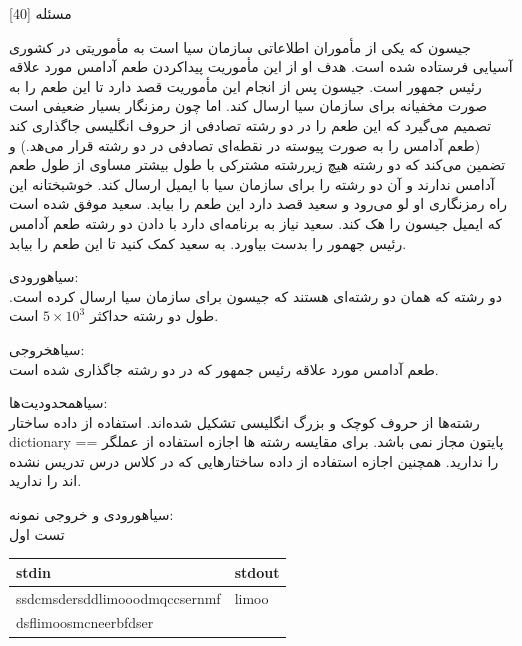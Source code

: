 ‌مسئله [40]

جیسون که یکی از مأموران اطلاعاتی سازمان سیا است به مأموریتی در کشوری آسیایی فرستاده شده است. هدف او از این مأموریت پیداکردن طعم آدامس مورد علاقه رئیس جمهور است. 
جیسون پس از انجام این مأموریت قصد دارد تا این طعم را به صورت مخفیانه برای سازمان سیا ارسال کند. اما چون رمزنگار بسیار ضعیفی است تصمیم می‌گیرد که این طعم را در دو رشته تصادفی از حروف انگلیسی جاگذاری کند (طعم آدامس را به صورت پیوسته در نقطه‌ای تصادفی در دو رشته قرار می‌هد.)  و تضمین می‌کند که دو رشته هیچ زیررشته مشترکی با طول بیشتر مساوی از طول طعم  آدامس  ندارند و آن دو رشته را برای سازمان سیا با ایمیل ارسال کند. خوشبختانه این راه رمزنگاری او لو می‌رود و سعید قصد دارد این طعم را بیابد. سعید موفق شده است که ایمیل جیسون را هک کند. سعید نیاز به برنامه‌ای دارد با دادن دو رشته طعم آدامس رئیس جهمور را بدست بیاورد.
به سعید کمک کنید تا این طعم را بیابد.

‌سیاه{ورودی:}\\
دو رشته که همان دو رشته‌ای هستند که جیسون برای سازمان سیا ارسال کرده است.
طول دو رشته حداکثر
$5 \times 10^3$
است.

‌سیاه{خروجی:}\\
طعم آدامس مورد علاقه رئیس جمهور که در دو رشته جاگذاری شده 
است.

‌سیاه{محدودیت‌ها:}\\
رشته‌ها از حروف کوچک و بزرگ انگلیسی تشکیل شده‌اند.
استفاده از داده ساختار dictionary پایتون مجاز نمی باشد. برای مقایسه رشته ها اجازه استفاده از عملگر == را ندارید. همچنین اجازه استفاده از داده ساختارهایی که در کلاس درس تدریس نشده اند را ندارید.

‌سیاه{ورودی و خروجی نمونه:}\\

تست اول
\begin{latin}
	\begin{tabularx}{\textwidth}{|X | X|}
		\hline
		\textbf{stdin} &
		\textbf{stdout}\\
		\hline
		ssdcmsdersddlimooodmqccsernmf & limoo \\
		dsflimoosmcneerbfdser & \\
		\hline
	\end{tabularx}
\end{latin}


